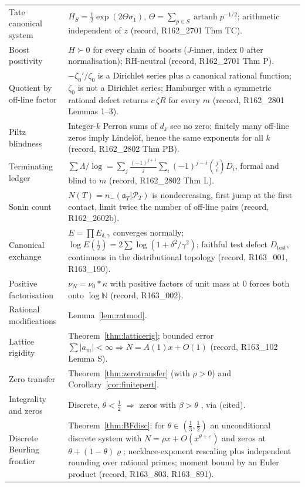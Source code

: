 \documentclass[11pt]{amsart}
\theoremstyle{definition}
\theoremstyle{remark}
\newcommand{\N}{\mathbb N}
\newcommand{\PT}{\mathcal P_T}
\begin{document}
\begin{longtable}{@{}p{4.2cm}p{10.3cm}@{}}
Tate canonical system & $H_S=\frac12\exp(2\Theta\sigma_1)$, $\Theta=\sum_{p\in S}\operatorname{artanh}p^{-1/2}$; arithmetic independent of $z$ (record, R162\_2701 Thm TC). \\
Boost positivity & $H\succ0$ for every chain of boosts ($J$-inner, index $0$ after normalisation); RH-neutral (record, R162\_2701 Thm P). \\
Quotient by off-line factor & $-\zeta_0'/\zeta_0$ is a Dirichlet series plus a canonical rational function; $\zeta_0$ is not a Dirichlet series; Hamburger with a symmetric rational defect returns $c\,\zeta R$ for every $m$ (record, R162\_2801 Lemmas 1--3). \\
Piltz blindness & Integer-$k$ Perron sums of $d_k$ see no zero; finitely many off-line zeros imply Lindel\"of, hence the same exponents for all $k$ (record, R162\_2802 Thm PB). \\
Terminating ledger & $\sum\Lambda/\log=\sum_j\frac{(-1)^{j+1}}j\sum_i(-1)^{j-i}\binom jiD_i$, formal and blind to $m$ (record, R162\_2802 Thm L). \\
Sonin count & $N(T)=n_-(\mathfrak a_T|\PT)$ is nondecreasing, first jump at the first contact, limit twice the number of off-line pairs (record, R162\_2602b). \\
Canonical exchange & $E=\prod E_{\delta,\gamma}$ converges normally; $\log E(\frac12)=2\sum\log(1+\delta^2/\gamma^2)$; faithful test defect $D_{\mathrm{test}}$, continuous in the distributional topology (record, R163\_001, R163\_190). \\
Positive factorisation & $\nu_N=\nu_0*\kappa$ with positive factors of unit mass at $0$ forces both onto $\log\N$ (record, R163\_002). \\
Rational modifications & Lemma~\ref{lem:ratmod}. \\
Lattice rigidity & Theorem~\ref{thm:latticerig}; bounded error $\sum|a_m|<\infty\Rightarrow N=A(1)x+O(1)$ (record, R163\_102 Lemma S). \\
Zero transfer & Theorem~\ref{thm:zerotransfer} (with $\rho>0$) and Corollary~\ref{cor:finitepert}. \\
Integrality and zeros & Discrete, $\theta<\frac12$ $\Rightarrow$ zeros with $\beta>\theta$ \cite[Rem.~7]{Revesz2023}, via \cite{Hilberdink2010} (cited). \\
Discrete Beurling frontier & Theorem~\ref{thm:BFdisc}: for $\theta\in(\frac13,\frac12)$ an unconditional discrete system with $N=\rho x+O(x^{\theta+\varepsilon})$ and zeros at $\theta+(1-\theta)\varrho$; necklace-exponent rescaling plus independent rounding over rational primes; moment bound by an Euler product (record, R163\_803, R163\_891). \\

\end{longtable}
\end{document}
